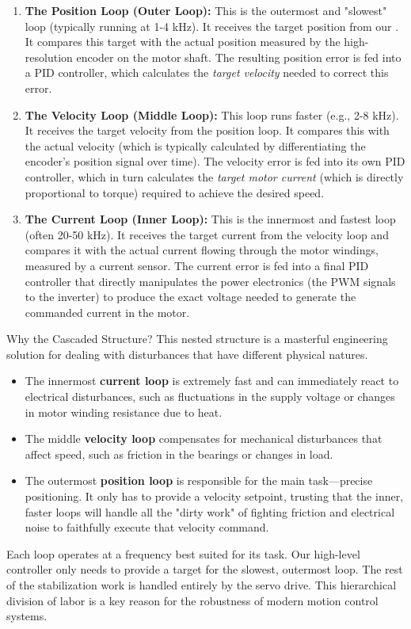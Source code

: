 \begin{enumerate}
    \item \textbf{The Position Loop (Outer Loop):} This is the outermost and "slowest" loop (typically running at 1-4 kHz). It receives the target position from our . It compares this target with the actual position measured by the high-resolution encoder on the motor shaft. The resulting position error is fed into a PID controller, which calculates the \textit{target velocity} needed to correct this error.
    
    \item \textbf{The Velocity Loop (Middle Loop):} This loop runs faster (e.g., 2-8 kHz). It receives the target velocity from the position loop. It compares this with the actual velocity (which is typically calculated by differentiating the encoder's position signal over time). The velocity error is fed into its own PID controller, which in turn calculates the \textit{target motor current} (which is directly proportional to torque) required to achieve the desired speed.
    
    \item \textbf{The Current Loop (Inner Loop):} This is the innermost and fastest loop (often 20-50 kHz). It receives the target current from the velocity loop and compares it with the actual current flowing through the motor windings, measured by a current sensor. The current error is fed into a final PID controller that directly manipulates the power electronics (the PWM signals to the inverter) to produce the exact voltage needed to generate the commanded current in the motor.
\end{enumerate}

\begin{tipbox}{Why the Cascaded Structure?}
    This nested structure is a masterful engineering solution for dealing with disturbances that have different physical natures.
    \begin{itemize}
        \item The innermost \textbf{current loop} is extremely fast and can immediately react to electrical disturbances, such as fluctuations in the supply voltage or changes in motor winding resistance due to heat.
        \item The middle \textbf{velocity loop} compensates for mechanical disturbances that affect speed, such as friction in the bearings or changes in load.
        \item The outermost \textbf{position loop} is responsible for the main task—precise positioning. It only has to provide a velocity setpoint, trusting that the inner, faster loops will handle all the "dirty work" of fighting friction and electrical noise to faithfully execute that velocity command.
    \end{itemize}
    Each loop operates at a frequency best suited for its task. Our high-level controller only needs to provide a target for the slowest, outermost loop. The rest of the stabilization work is handled entirely by the servo drive. This hierarchical division of labor is a key reason for the robustness of modern motion control systems.
\end{tipbox}

